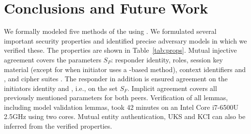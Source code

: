 \documentclass[runningheads, envcountsame, hidelinks, a4paper, draft, x11names]{llncs}
\begin{document}
\section{Conclusions and Future Work}
\label{sec:conclusions}
%
We formally modeled five
methods of the \mEdhoc{} \mSpec{} using \mTamarin.
%
We formulated several important security properties and identified precise
adversary models in which we verified these.
%
The properties are shown in Table~\ref{tab:props}.
%
Mutual injective agreement covers the parameters $S_P$:
responder identity, roles, session key material (except for \mGiy{} when
initiator uses a \mStat-based
method), context identifiers \mCi{} and \mCr, and cipher suites \mSuites.
%
The responder in addition is ensured agreement on the initiators identity and
\mGiy, i.e., on the set $S_F$.
%
Implicit agreement covers all previously mentioned parameters for both peers.
%
Verification of all lemmas, including model validation lemmas, took 42 minutes
on an Intel Core i7-6500U 2.5GHz using two cores.
%
Mutual entity authentication, UKS and KCI can also be inferred from the
verified properties.
%
\end{document}
